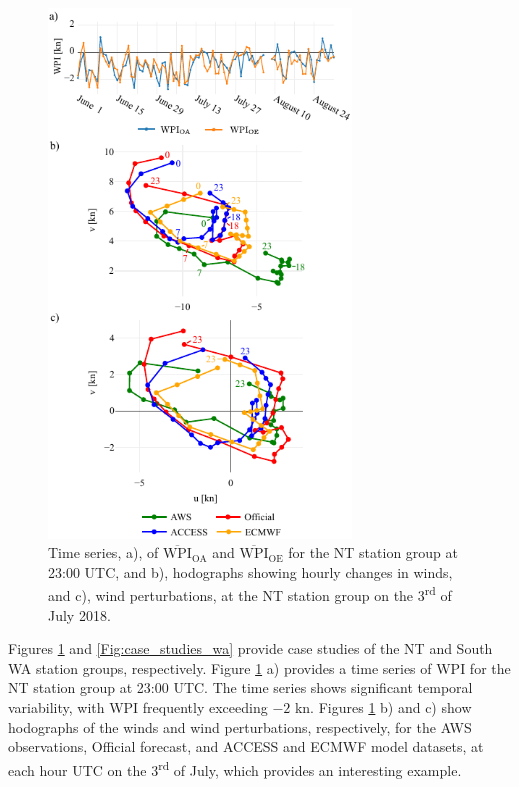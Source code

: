 \documentclass{ametsoc}
\begin{document}
\begin{figure}
\centering
\includegraphics[width=19pc]{case_studies_nt.pdf}
\caption{Time series, a), of $\overline{\text{WPI}}_\text{OA}$ and $\overline{\text{WPI}}_\text{OE}$ for the NT station group at 23:00 UTC, and b), hodographs showing hourly changes in winds, and c), wind perturbations, at the NT station group on the 3\textsuperscript{rd} of July 2018.} 
\label{Fig:case_studies_nt}
\end{figure}

Figures \ref{Fig:case_studies_nt} and \ref{Fig:case_studies_wa} provide case studies of the NT and South WA station groups, respectively. Figure \ref{Fig:case_studies_nt} a) provides a time series of WPI for the NT station group at 23:00 UTC. The time series shows significant temporal variability, with WPI frequently exceeding $-2$ kn. Figures \ref{Fig:case_studies_nt} b) and c) show hodographs of the winds and wind perturbations, respectively, for the AWS observations, Official forecast, and ACCESS and ECMWF model datasets, at each hour UTC on the 3\textsuperscript{rd} of July, which provides an interesting example. 
\end{document}
